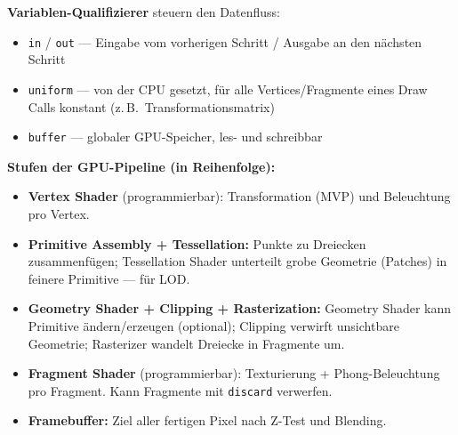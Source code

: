 \documentclass[12pt, a4paper]{article}
\begin{document}
\textbf{Variablen-Qualifizierer} steuern den Datenfluss:
\begin{itemize}
  \item \texttt{in} / \texttt{out} — Eingabe vom vorherigen Schritt / Ausgabe an den nächsten Schritt
  \item \texttt{uniform} — von der CPU gesetzt, für alle Vertices/Fragmente eines Draw Calls konstant (z.\,B.\ Transformationsmatrix)
  \item \texttt{buffer} — globaler GPU-Speicher, les- und schreibbar
\end{itemize}

\textbf{Stufen der GPU-Pipeline (in Reihenfolge):}

\begin{center}
\end{center}

\begin{itemize}
  \item \textbf{Vertex Shader} (programmierbar): Transformation (MVP) und Beleuchtung pro Vertex.
  \item \textbf{Primitive Assembly + Tessellation:} Punkte zu Dreiecken zusammenfügen; Tessellation Shader unterteilt grobe Geometrie (Patches) in feinere Primitive — für LOD.
  \item \textbf{Geometry Shader + Clipping + Rasterization:} Geometry Shader kann Primitive ändern/erzeugen (optional); Clipping verwirft unsichtbare Geometrie; Rasterizer wandelt Dreiecke in Fragmente um.
  \item \textbf{Fragment Shader} (programmierbar): Texturierung + Phong-Beleuchtung pro Fragment. Kann Fragmente mit \texttt{discard} verwerfen.
  \item \textbf{Framebuffer:} Ziel aller fertigen Pixel nach Z-Test und Blending.
\end{itemize}
\end{document}
